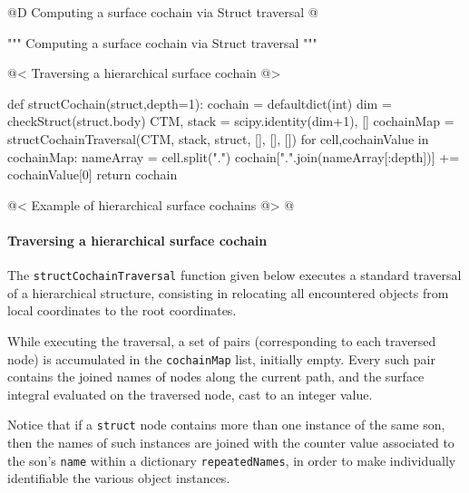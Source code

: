 \documentclass[11pt,oneside]{article}    %
\begin{document}
@D Computing a surface cochain via Struct traversal
@{""" Computing a surface cochain via Struct traversal """

@< Traversing a hierarchical surface cochain @>

def structCochain(struct,depth=1):
    cochain = defaultdict(int)
    dim = checkStruct(struct.body)
    CTM, stack = scipy.identity(dim+1), []
    cochainMap = structCochainTraversal(CTM, stack, struct, [], [], []) 
    for cell,cochainValue in cochainMap:
        nameArray = cell.split(".")
        cochain[".".join(nameArray[:depth])] += cochainValue[0]
    return cochain
    
@< Example of hierarchical surface cochains @>
@}

\paragraph{Traversing a hierarchical surface cochain}
The \texttt{structCochainTraversal} function given below executes a standard traversal of a hierarchical structure, consisting in relocating all encountered objects from local coordinates to the root coordinates. 

While executing the traversal, a set of pairs (corresponding to each traversed node) is accumulated in the \texttt{cochainMap} list, initially empty. Every such pair contains the joined names of nodes along the current path, and the surface integral evaluated on the traversed node, cast to an integer value. 

Notice that if a \texttt{struct} node contains more than one instance of the same son, then the names of such instances are joined with the counter value associated to the son's \texttt{name} within a dictionary \texttt{repeatedNames}, in order to make individually identifiable the various object instances.
\end{document}
